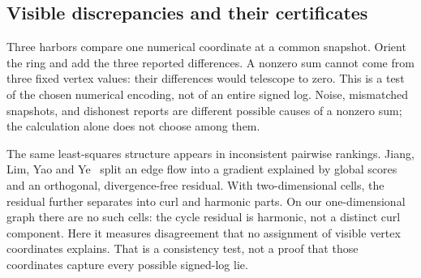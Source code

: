 \documentclass[11pt,a4paper]{article}
\theoremstyle{definition}
\theoremstyle{remark}
\begin{document}
\subsection{Visible discrepancies and their certificates}\label{sec:fh-sheaf}

%
Three harbors compare one numerical coordinate at a common snapshot. Orient
the ring and add the three reported differences. A nonzero sum cannot come
from three fixed vertex values: their differences would telescope to zero.
This is a test of the chosen numerical encoding, not of an entire signed log.
Noise, mismatched snapshots, and dishonest reports are different possible
causes of a nonzero sum; the calculation alone does not choose among them.

The same least-squares structure appears in inconsistent pairwise rankings.
Jiang, Lim, Yao and Ye~ split an edge flow into a
gradient explained by global scores and an orthogonal, divergence-free residual.
With two-dimensional cells, the residual further separates into curl and harmonic
parts. On our one-dimensional graph there are no such cells: the cycle residual
is harmonic, not a distinct curl component. Here it measures disagreement that
no assignment of visible vertex coordinates explains. That is a consistency
test, not a proof that those coordinates capture every possible signed-log lie.
\end{document}
